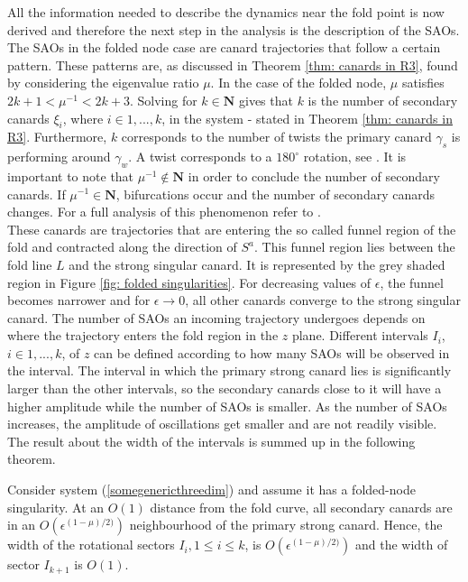 All the information needed to describe the dynamics near the fold point is now derived and therefore the next step in the analysis is the description of the SAOs. The SAOs in the folded node case are canard trajectories that follow a certain pattern. These patterns are, as discussed in Theorem \ref{thm: canards in R3}, found by considering the eigenvalue ratio $\mu$.
In the case of the folded node, $\mu$ satisfies $2k+1 < \mu^{-1} < 2k +3 $. Solving for $k \in \mathbf{N}$ gives that $k$ is the number of secondary canards $\xi_i$, where $i \in 1,...,k$, in the system - stated in Theorem \ref{thm: canards in R3}. Furthermore, $k$ corresponds to the number of twists the primary canard $\gamma_s$ is performing around $\gamma_w$. A twist corresponds to a $180^{\circ}$ rotation, see \citet{Kuehn}. It is important to note that $\mu^{-1} \notin \mathbf{N}$ in order to conclude the number of secondary canards. If $\mu^{-1} \in \mathbf{N}$, bifurcations occur and the number of secondary canards changes. For a full analysis of this phenomenon refer to \citet{wechselberger2005}.\\

These canards are trajectories that are entering the so called funnel region of the fold and contracted along the direction of $S^a$. This funnel region lies between the fold line $L$ and the strong singular canard. It is represented by the grey shaded region in Figure \ref{fig: folded singularities}.
For decreasing values of $\epsilon$, the funnel becomes narrower and for $\epsilon \to 0$, all other canards converge to the strong singular canard.
The number of SAOs an incoming trajectory undergoes depends on where the trajectory enters the fold region in the $z$ plane. Different intervals $I_i$, $i \in 1,...,k$, of $z$ can be defined according to how many SAOs will be observed in the interval.
The interval in which the primary strong canard lies is significantly larger than the other intervals, so the secondary canards close to it will have a higher amplitude while the number of SAOs is smaller. As the number of SAOs increases, the amplitude of oscillations get smaller and are not readily visible.
The result about the width of the intervals is summed up in the following theorem.

\begin{theorem}
Consider system (\ref{somegenericthreedim}) and assume it has a folded-node singularity. At an $O(1)$ distance from the fold curve, all secondary canards are in an $O(\epsilon^{(1- \mu)/2)})$ neighbourhood of the primary strong canard. Hence, the width of the  rotational sectors $I_i, 1 \leq i \leq k$, is $O(\epsilon^{(1- \mu)/2)})$ and the width of sector $I_{k+1}$ is $O(1)$.
\end{theorem}


